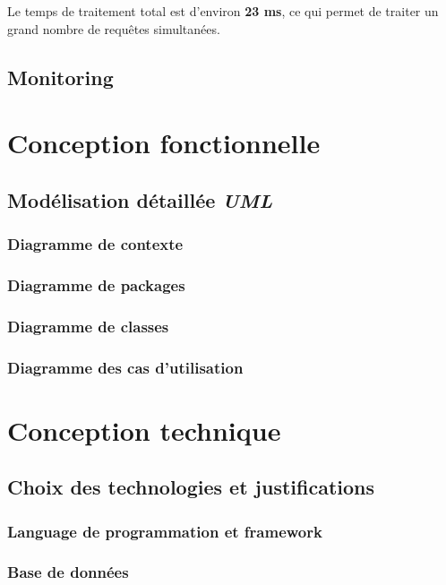 \documentclass[11pt,a4paper]{report}
\begin{document}
Le temps de traitement total est d'environ \textbf{23 ms}, ce qui permet de traiter un grand nombre de requêtes simultanées.


\subsection{Monitoring}

\section{Conception fonctionnelle}


\subsection{Modélisation détaillée \textit{UML}}

\subsubsection{Diagramme de contexte}

\subsubsection{Diagramme de packages}

\subsubsection{Diagramme de classes}

\subsubsection{Diagramme des cas d'utilisation}

\section{Conception technique}
 \subsection{Choix des technologies et justifications}
   \subsubsection{Language de programmation et framework}
   \subsubsection{Base de données}
\end{document}

